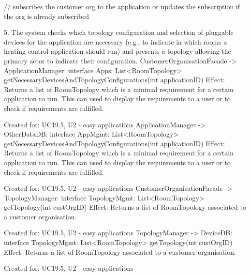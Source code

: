 {{{                    // subscribes the customer org to the application or updates the subscription if the org is already subscribed

            5. The system checks which topology configuration and selection of pluggable devices for the application are necessary
               (e.g., to indicate in which rooms a heating control application should run)
               and presents a topology allowing the primary actor to indicate their configuration.
                    CustomerOrganisationFacade -> ApplicationManager: interface Apps:         List<RoomTopology> getNecessaryDevicesAndTopologyConfigurations(int applicationID)
                        Effect: Returns a list of RoomTopology which is a minimal requirement for a certain application to run. This can used to display the requirements to a user or to check if requirements are fulfilled.
                        \item Created for: UC19.5, U2 - easy applications
                    ApplicationManager -> OtherDataDB:                interface AppMgmt:      List<RoomTopology> getNecessaryDevicesAndTopologyConfigurations(int applicationID)
                        Effect: Returns a list of RoomTopology which is a minimal requirement for a certain application to run. This can used to display the requirements to a user or to check if requirements are fulfilled.
                        \item Created for: UC19.5, U2 - easy applications
                    CustomerOrganisationFacade -> TopologyManager:    interface TopologyMgmt: List<RoomTopology> getTopology(int custOrgID)
                        Effect: Returns a list of RoomTopology associated to a customer organisation.
                        \item Created for: UC19.5, U2 - easy applications
                    TopologyManager -> DeviceDB:                      interface TopologyMgmt: List<RoomTopology> getTopology(int custOrgID)
                        Effect: Returns a list of RoomTopology associated to a customer organisation.
                        \item Created for: UC19.5, U2 - easy applications

}}}
